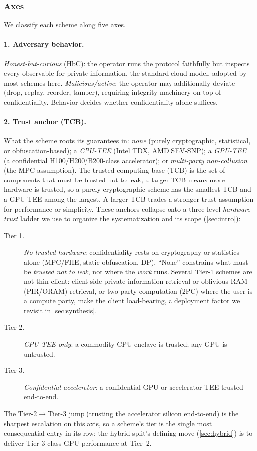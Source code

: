 \subsubsection{Axes}
\label{sec:threat-axes}

We classify each scheme along five axes.

\paragraph{1. Adversary behavior.}
\emph{Honest-but-curious} (HbC): the operator runs the protocol faithfully but inspects every
observable for private information, the standard cloud model, adopted by most schemes here.
\emph{Malicious/active}: the operator may additionally deviate (drop, replay, reorder, tamper),
requiring integrity machinery on top of confidentiality. Behavior decides whether
confidentiality alone suffices.

\paragraph{2. Trust anchor (TCB).}
What the scheme roots its guarantees in: \emph{none} (purely cryptographic, statistical, or
obfuscation-based); a \emph{CPU-TEE} (Intel TDX, AMD SEV-SNP); a \emph{GPU-TEE} (a
confidential H100/H200/B200-class accelerator); or \emph{multi-party non-collusion} (the MPC
assumption). The trusted computing base (TCB) is the set of components that must be trusted not
to leak; a larger TCB means more hardware is trusted, so a purely cryptographic scheme has the
smallest TCB and a GPU-TEE among the largest. A larger TCB trades a stronger trust assumption for
performance or simplicity.
These anchors collapse onto a three-level \emph{hardware-trust} ladder we use to
organize the systematization and its scope (\cref{sec:intro}):
\begin{description}
  \item[Tier 1.] \emph{No trusted hardware}: confidentiality rests on cryptography or
        statistics alone (MPC/FHE, static obfuscation, DP). ``None'' constrains what must be
        \emph{trusted not to leak}, not where the \emph{work} runs. Several Tier-1 schemes are
        not thin-client: client-side private information retrieval or oblivious RAM (PIR/ORAM)
        retrieval, or two-party computation (2PC) where the user is a compute
        party, make the client load-bearing, a deployment factor we revisit in
        \cref{sec:synthesis}.
  \item[Tier 2.] \emph{CPU-TEE only}: a commodity CPU enclave is trusted; any GPU is untrusted.
  \item[Tier 3.] \emph{Confidential accelerator}: a confidential GPU or accelerator-TEE trusted
        end-to-end.
\end{description}
The Tier-2$\to$Tier-3 jump (trusting the accelerator silicon end-to-end) is the sharpest
escalation on this axis, so a scheme's tier is the single most consequential entry in its row;
the hybrid split's defining move (\cref{sec:hybrid}) is to deliver Tier-3-class GPU performance
at Tier~2.

